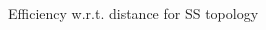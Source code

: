\begin{figure}[H]
\centering
\begin{subfigmatrix}{1} 
\end{subfigmatrix}
\caption{Efficiency w.r.t. distance for SS topology}
\end{figure}


